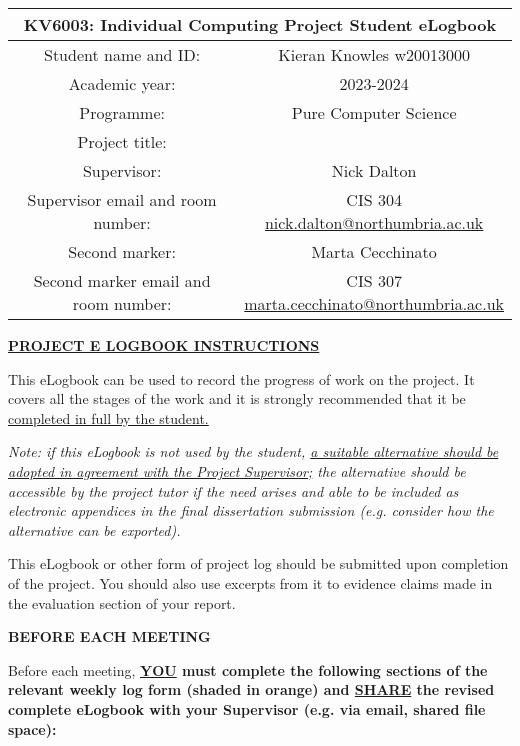 \documentclass[../CHEFCookingHelperForEveryonesFridge.tex]{subfiles}
\begin{document}
\begin{table}[h!]
    \centering
    \begin{tabular}{|c|c|}
        \hline
        \multicolumn{2}{|c|}{KV6003: Individual Computing Project Student eLogbook} \\\hline
        Student name and ID: & Kieran Knowles w20013000 \\\hline
        Academic year: & 2023-2024 \\\hline
        Programme: & Pure Computer Science \\\hline
        Project title: & \chef{} \\\hline
        Supervisor: & Nick Dalton \\\hline
        Supervisor email and room number: & \makecell[c]{
            CIS 304 \\
            \href{mailto:nick.dalton@northumbria.ac.uk}{nick.dalton@northumbria.ac.uk}
        } \\\hline
        Second marker: & Marta Cecchinato \\\hline
        Second marker email and room number: & \makecell[c]{
            CIS 307 \\
            \href{mailto:marta.cecchinato@northumbria.ac.uk}{marta.cecchinato@northumbria.ac.uk}
        } \\\hline
    \end{tabular}
\end{table}

\textbf{\underline{PROJECT E LOGBOOK INSTRUCTIONS}}

This eLogbook can be used to record the progress of work on the project. It covers all the stages of the
work and it is strongly recommended that it be \ul{completed in full by the student.}

\textit{
    Note: if this eLogbook is not used by the student, \ul{a suitable alternative should be adopted in agreement with
    the Project Supervisor;} the alternative should be accessible by the project tutor if the need arises and able
    to be included as electronic appendices in the final dissertation submission (e.g. consider how the alternative
    can be exported).
}

This eLogbook or other form of project log should be submitted upon completion of the project.
You should also use excerpts from it to evidence claims made in the evaluation section of your report.

\textbf{BEFORE EACH MEETING}

Before each meeting, \textbf{\ul{YOU} must complete the following sections of the relevant weekly log form
(\colorbox{\logbookshadecolour}{shaded in orange}) and \ul{SHARE} the revised complete eLogbook with your Supervisor
(e.g. via email, shared file space):}
\end{document}
